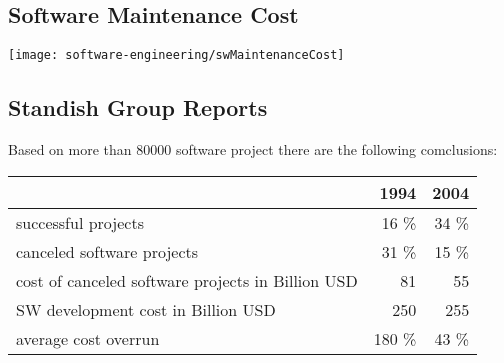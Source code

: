 \subsection{Software Maintenance Cost}
\texttt{[image: software-engineering/swMaintenanceCost]}
%
\newpage
\subsection{Standish Group Reports}
Based on more than 80000 software project there are the following comclusions:


\begin{center}
\begin{tabular}{lrr}
      & 1994 & 2004 \\
\hline
successful projects & 16 \% & 34 \%\\
 canceled software projects & 31 \% & 15 \% \\
cost of canceled software projects in Billion USD &  81  &  55\\
SW development cost in Billion USD &  250  &  255  \\
 average cost overrun & 180 \% & 43 \% \\
\end{tabular}
\end{center}
\renewcommand{\arraystretch}{1.2}
\ifslides
